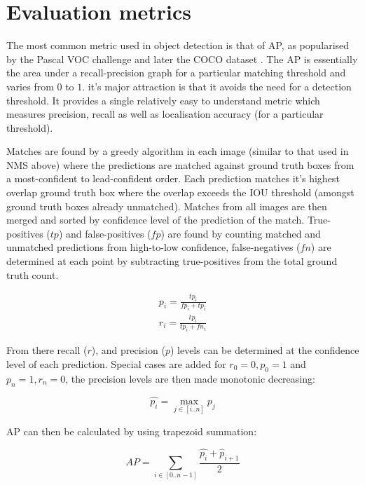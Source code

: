 \section{Evaluation metrics}
\label{sec:evaluation_metrics}

The most common metric used in object detection is that of \gls{AP}, as popularised by the Pascal VOC challenge \cite{Everingham2008} and later the COCO dataset \cite{Lin2014}. The \gls{AP} is essentially the area under a recall-precision graph for a particular matching threshold and varies from $0$  to $1$. it's major attraction is that it avoids the need for a detection threshold. It provides a single relatively easy to understand metric which measures precision, recall as well as localisation accuracy (for a particular threshold).

Matches are found by a greedy algorithm in each image (similar to that used in \gls{NMS} above) where the predictions are matched against ground truth boxes from a most-confident to lead-confident order. Each prediction matches it's highest overlap ground truth box where the overlap exceeds the \gls{IOU} threshold (amongst ground truth boxes already unmatched). Matches from all images are then merged and sorted by confidence level of the prediction of the match. True-positives ($tp$) and false-positives ($fp$) are found by counting matched and unmatched predictions from high-to-low confidence, false-negatives ($fn$) are determined at each point by subtracting true-positives from the total ground truth count. 

\begin{equation*}
\begin{split}
p_i = \frac{tp_i}{fp_i + tp_i}\\
r_i = \frac{tp_i}{tp_i + fn_i}
\end{split}
\end{equation*}

From there recall ($r$), and precision ($p$) levels can be determined at the confidence level of each prediction. Special cases are added for $r_0=0, p_0=1$ and $p_n=1, r_n=0$, the precision levels are then made monotonic decreasing:

\begin{equation}
\hat{p_i} = \max_{j \in [i..n]}{p_j}
\end{equation}

\gls{AP} can then be calculated by using trapezoid summation:

\begin{equation}
AP = \sum_{i \in [0..n-1]}\frac{\hat{p_i} + \hat{p}_{i + 1}}{2}
\end{equation}


